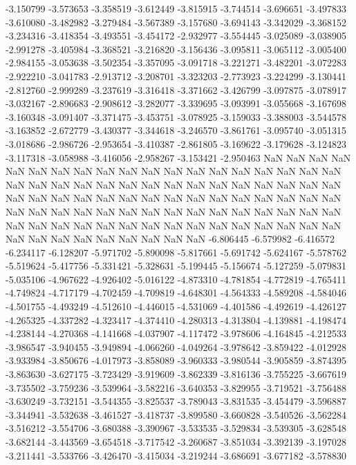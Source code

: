 -3.150799
-3.573653
-3.358519
-3.612449
-3.815915
-3.744514
-3.696651
-3.497833
-3.610080
-3.482982
-3.279484
-3.567389
-3.157680
-3.694143
-3.342029
-3.368152
-3.234316
-3.418354
-3.493551
-3.454172
-2.932977
-3.554445
-3.025089
-3.038905
-2.991278
-3.405984
-3.368521
-3.216820
-3.156436
-3.095811
-3.065112
-3.005400
-2.984155
-3.053638
-3.502354
-3.357095
-3.091718
-3.221271
-3.482201
-3.072283
-2.922210
-3.041783
-2.913712
-3.208701
-3.323203
-2.773923
-3.224299
-3.130441
-2.812760
-2.999289
-3.237619
-3.316418
-3.371662
-3.426799
-3.097875
-3.078917
-3.032167
-2.896683
-2.908612
-3.282077
-3.339695
-3.093991
-3.055668
-3.167698
-3.160348
-3.091407
-3.371475
-3.453751
-3.078925
-3.159033
-3.388003
-3.544578
-3.163852
-2.672779
-3.430377
-3.344618
-3.246570
-3.861761
-3.095740
-3.051315
-3.018686
-2.986726
-2.953654
-3.410387
-2.861805
-3.169622
-3.179628
-3.124823
-3.117318
-3.058988
-3.416056
-2.958267
-3.153421
-2.950463
NaN
NaN
NaN
NaN
NaN
NaN
NaN
NaN
NaN
NaN
NaN
NaN
NaN
NaN
NaN
NaN
NaN
NaN
NaN
NaN
NaN
NaN
NaN
NaN
NaN
NaN
NaN
NaN
NaN
NaN
NaN
NaN
NaN
NaN
NaN
NaN
NaN
NaN
NaN
NaN
NaN
NaN
NaN
NaN
NaN
NaN
NaN
NaN
NaN
NaN
NaN
NaN
NaN
NaN
NaN
NaN
NaN
NaN
NaN
NaN
NaN
NaN
NaN
NaN
NaN
NaN
NaN
NaN
NaN
NaN
NaN
NaN
NaN
NaN
NaN
NaN
NaN
NaN
NaN
NaN
NaN
NaN
NaN
NaN
NaN
NaN
NaN
NaN
-6.806445
-6.579982
-6.416572
-6.234117
-6.128207
-5.971702
-5.890098
-5.817661
-5.691742
-5.624167
-5.578762
-5.519624
-5.417756
-5.331421
-5.328631
-5.199445
-5.156674
-5.127259
-5.079831
-5.035106
-4.967622
-4.926402
-5.016122
-4.873310
-4.781854
-4.772819
-4.765411
-4.749824
-4.717179
-4.702459
-4.709819
-4.648301
-4.564333
-4.589208
-4.584046
-4.501755
-4.493249
-4.512610
-4.446015
-4.531069
-4.401586
-4.492619
-4.426127
-4.265325
-4.337282
-4.323417
-4.374410
-4.280313
-4.313804
-4.139881
-4.198474
-4.238144
-4.270368
-4.141668
-4.037907
-4.117472
-3.978606
-4.164845
-4.212533
-3.986547
-3.940455
-3.949894
-4.066260
-4.049264
-3.978642
-3.859422
-4.012928
-3.933984
-3.850676
-4.017973
-3.858089
-3.960333
-3.980544
-3.905859
-3.874395
-3.863630
-3.627175
-3.723429
-3.919609
-3.862339
-3.816136
-3.755225
-3.667619
-3.735502
-3.759236
-3.539964
-3.582216
-3.640353
-3.829955
-3.719521
-3.756488
-3.630249
-3.732151
-3.544355
-3.825537
-3.789043
-3.831535
-3.454479
-3.596887
-3.344941
-3.532638
-3.461527
-3.418737
-3.899580
-3.660828
-3.540526
-3.562284
-3.516212
-3.554706
-3.680388
-3.390967
-3.533535
-3.529834
-3.539305
-3.628548
-3.682144
-3.443569
-3.654518
-3.717542
-3.260687
-3.851034
-3.392139
-3.197028
-3.211441
-3.533766
-3.426470
-3.415034
-3.219244
-3.686691
-3.677182
-3.578830
